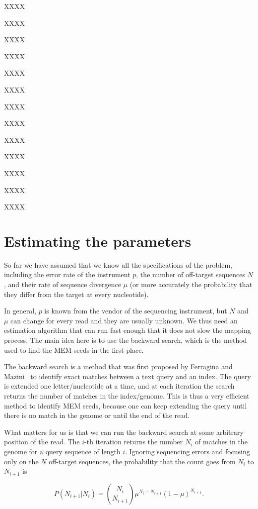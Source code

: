 \documentclass{article}
\begin{document}
XXXX

XXXX

XXXX

XXXX

XXXX

XXXX

XXXX

XXXX

XXXX

XXXX

XXXX

XXXX

XXXX


\section{Estimating the parameters}
\label{sec:est}

So far we have assumed that we know all the specifications of the problem,
including the error rate of the instrument $p$, the number of off-target
sequences $N$, and their rate of sequence divergence $\mu$ (or more
accurately the probability that they differ from the target at every
nucleotide).

In general, $p$ is known from the vendor of the sequencing instrument, but
$N$ and $\mu$ can change for every read and they are usually unknown. We
thus need an estimation algorithm that can run fast enough that it does
not slow the mapping process. The main idea here is to use the backward
search, which is the method used to find the MEM seeds in the first place.

The backward search is a method that was first proposed by Ferragina and
Mazini~\cite{ferragina2000opportunistic} to identify exact matches between
a text query and an index. The query is extended one letter/nucleotide at
a time, and at each iteration the search returns the number of matches in
the index/genome. This is thus a very efficient method to identify MEM
seeds, because one can keep extending the query until there is no match in
the genome or until the end of the read.

What matters for us is that we can run the backward search at some
arbitrary position of the read. The $i$-th iteration returns the number
$N_i$ of matches in the genome for a query sequence of length $i$.
Ignoring sequencing errors and focusing only on the $N$ off-target
sequences, the probability that the count goes from $N_i$ to $N_{i+1}$ is

\begin{equation*}
P(N_{i+1}|N_i) = {N_i \choose N_{i+1}}
\mu^{N_i-N_{i+1}}(1-\mu)^{N_{i+1}}.
\end{equation*}
\end{document}
